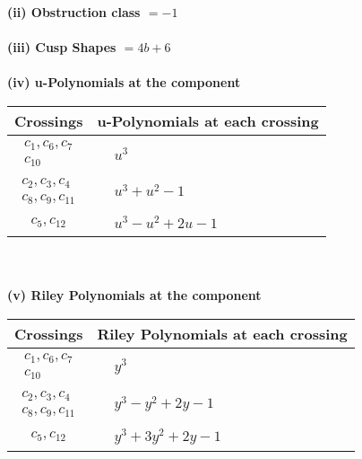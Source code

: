 \documentclass[1p]{elsarticle_modified}
\theoremstyle{definition}
\begin{document}
\flushleft \textbf{(ii) Obstruction class $= -1$}\\~\\
\flushleft \textbf{(iii) Cusp Shapes $= 4 b+6$}\\~\\
\newpage\renewcommand{\arraystretch}{1}
\flushleft \textbf{(iv) u-Polynomials at the component}\newline \\
\begin{tabular}{m{50pt}|m{274pt}}
Crossings & \hspace{64pt}u-Polynomials at each crossing \\
\hline $$\begin{aligned}c_{1},c_{6},c_{7}\\c_{10}\end{aligned}$$&$\begin{aligned}
&u^3
\end{aligned}$\\
\hline $$\begin{aligned}c_{2},c_{3},c_{4}\\c_{8},c_{9},c_{11}\end{aligned}$$&$\begin{aligned}
&u^3+u^2-1
\end{aligned}$\\
\hline $$\begin{aligned}c_{5},c_{12}\end{aligned}$$&$\begin{aligned}
&u^3- u^2+2 u-1
\end{aligned}$\\
\hline
\end{tabular}\\~\\
\newpage\renewcommand{\arraystretch}{1}
\flushleft \textbf{(v) Riley Polynomials at the component}\newline \\
\begin{tabular}{m{50pt}|m{274pt}}
Crossings & \hspace{64pt}Riley Polynomials at each crossing \\
\hline $$\begin{aligned}c_{1},c_{6},c_{7}\\c_{10}\end{aligned}$$&$\begin{aligned}
&y^3
\end{aligned}$\\
\hline $$\begin{aligned}c_{2},c_{3},c_{4}\\c_{8},c_{9},c_{11}\end{aligned}$$&$\begin{aligned}
&y^3- y^2+2 y-1
\end{aligned}$\\
\hline $$\begin{aligned}c_{5},c_{12}\end{aligned}$$&$\begin{aligned}
&y^3+3 y^2+2 y-1
\end{aligned}$\\
\hline
\end{tabular}\\~\\
\end{document}
